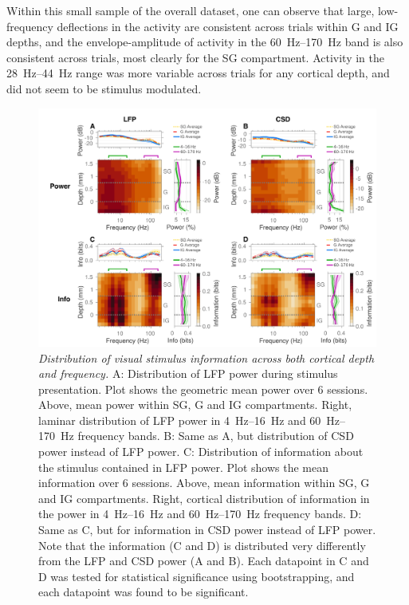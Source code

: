 Within this small sample of the overall dataset, one can observe that large, low-frequency deflections in the activity are consistent across trials within \ac{G} and \ac{IG} depths, and the envelope-amplitude of activity in the \SIrange{60}{170}{Hz} band is also consistent across trials, most clearly for the \ac{SG} compartment.
Activity in the \SIrange{28}{44}{Hz} range was more variable across trials for any cortical depth, and did not seem to be stimulus modulated.

\begin{figure}[htbp]
\centering \includegraphics[width=\columnwidth]{paperfigs/fig2}
%
\caption{%
\textit{Distribution of visual stimulus information across both cortical depth and frequency.}
A: Distribution of \ac{LFP} power during stimulus presentation.
Plot shows the geometric mean power over \num{6} sessions.
Above, mean power within \ac{SG}, \ac{G} and \ac{IG} compartments.
Right, laminar distribution of \ac{LFP} power in \SIrange{4}{16}{Hz} and \SIrange{60}{170}{Hz} frequency bands.
B: Same as A, but distribution of \ac{CSD} power instead of \ac{LFP} power.
C: Distribution of information about the stimulus contained in \ac{LFP} power.
Plot shows the mean information over \num{6} sessions.
Above, mean information within \ac{SG}, \ac{G} and \ac{IG} compartments.
Right, cortical distribution of information in the power in \SIrange{4}{16}{Hz} and \SIrange{60}{170}{Hz} frequency bands.
D: Same as C, but for information in \ac{CSD} power instead of \ac{LFP} power.
Note that the information (C and D) is distributed very differently from the \ac{LFP} and \ac{CSD} power (A and B).
Each datapoint in C and D was tested for statistical significance using bootstrapping, and each datapoint was found to be significant.
}%
\label{fig:lam_2}
\end{figure}

